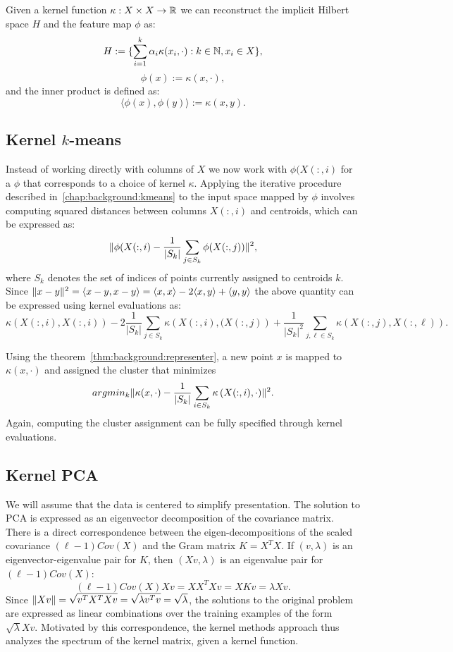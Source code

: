 \begin{theorem}\label{thm:background:representer}
Given a kernel function $\kappa: X \times X \rightarrow \mathbb{R}$ we can reconstruct the implicit Hilbert space $H$ and the feature map $\phi$ as:
$$ H := \{ \sum_{i=1}^k \alpha_i \kappa(x_i, \cdot): k \in \mathbb{N}, x_i \in X \},$$
$$ \phi(x) := \kappa(x, \cdot), $$ and the inner product is defined as:
$$ \langle \phi(x), \phi(y) \rangle := \kappa(x,y).$$
\end{theorem}

\subsection{Kernel $k$-means}

Instead of working directly with columns of $X$ we now work with $\phi(X(:,i)$ for a $\phi$ that corresponds to a choice of kernel $\kappa$.
Applying the iterative procedure described in~\ref{chap:background:kmeans} to the input space mapped by $\phi$ involves computing squared distances between columns $X(:,i)$ and centroids, which can be expressed as:
$$ \lVert \phi(X(:,i) - \frac{1}{|S_k|} \sum_{j \in S_k} \phi(X(:,j)) \rVert^2,$$
where $S_k$ denotes the set of indices of points currently assigned to centroids $k$.
Since $\lVert x - y\rVert^2 = \langle x-y, x-y \rangle = \langle x,x \rangle - 2 \langle x, y \rangle + \langle y, y \rangle$
the above quantity can be expressed using kernel evaluations as:
$$ \kappa\left(X(:,i),X(:,i)\right) - 2 \frac{1}{|S_k|} \sum_{j \in S_k} \kappa\left(X(:,i), (X(:,j) \right) + \frac{1}{|S_k|^2} \sum_{j,\ell \in S_k} \kappa\left( X(:,j), X(:,\ell) \right).$$

Using the theorem~\ref{thm:background:representer}, a new point $x$ is mapped to $\kappa(x, \cdot)$ and assigned the cluster that
minimizes
$$ argmin_k \lVert \kappa(x,\cdot) - \frac{1}{|S_k|} \sum_{i \in S_k} \kappa\left(X(:,i), \cdot\right)\rVert^2.$$
Again, computing the cluster assignment can be fully specified through kernel evaluations.

\subsection{Kernel PCA}

We will assume that the data is centered to simplify presentation.
The solution to PCA is expressed as an eigenvector decomposition of the covariance matrix. There is a direct correspondence between
the eigen-decompositions of the scaled covariance $(\ell - 1) Cov(X)$ and the Gram matrix $K = X^T X$.
If $(v, \lambda)$ is an eigenvector-eigenvalue pair for $K$, then $(X v, \lambda)$ is an eigenvalue pair for $(\ell - 1) Cov(X)$:
$$ (\ell - 1) Cov(X) X v = X X^T X v = X K v = \lambda X v.$$
Since $\lVert X v\rVert = \sqrt{v^T X^T X v} = \sqrt{ \lambda v^T v } = \sqrt{\lambda}$,
the solutions to the original problem are expressed as linear combinations over the training examples of the form $\sqrt{\lambda}X v$.
Motivated by this correspondence, the kernel methods approach thus analyzes the spectrum of the kernel matrix, given a kernel function.

